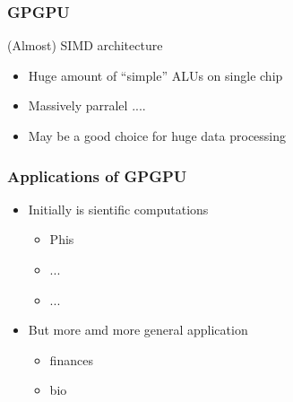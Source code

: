 \documentclass[xcolor=table]{beamer}
\begin{document}
\begin{frame}[fragile]
  \transwipe[direction=90]
  \frametitle{GPGPU}
  \begin{minipage}[m]{0.45\linewidth}
\end{minipage}\hfill
\begin{minipage}[m]{0.5\linewidth}
(Almost) SIMD architecture
\begin{itemize}
      \item Huge amount of ``simple'' ALUs on single chip
      \item Massively parralel ....
      \item May be a good choice for huge data processing
\end{itemize}

\end{minipage}

\end{frame}

\begin{frame}[fragile]
  \transwipe[direction=90]
  \frametitle{Applications of GPGPU}
  \begin{itemize}
    \item Initially is sientific computations
    \begin{itemize}
      \item Phis
      \item ...
      \item ...
    \end{itemize}
    \item But more amd more general application
      \begin{itemize} 
        \item finances
        \item bio
      \end{itemize}
  \end{itemize}
\end{frame}
\end{document}
